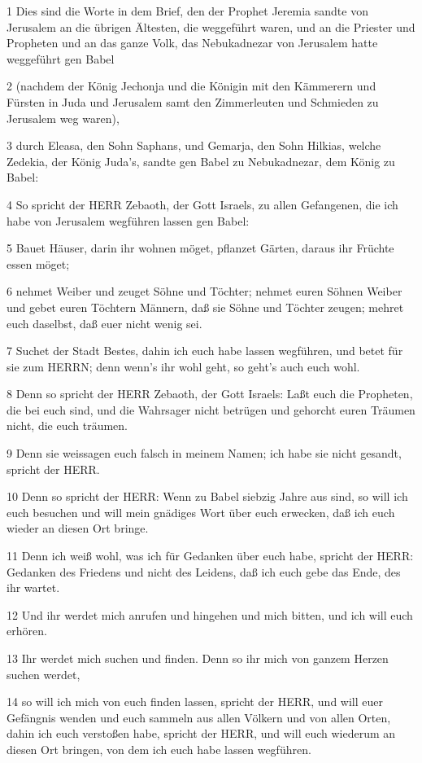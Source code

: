 \par 1 Dies sind die Worte in dem Brief, den der Prophet Jeremia sandte von Jerusalem an die übrigen Ältesten, die weggeführt waren, und an die Priester und Propheten und an das ganze Volk, das Nebukadnezar von Jerusalem hatte weggeführt gen Babel
\par 2 (nachdem der König Jechonja und die Königin mit den Kämmerern und Fürsten in Juda und Jerusalem samt den Zimmerleuten und Schmieden zu Jerusalem weg waren),
\par 3 durch Eleasa, den Sohn Saphans, und Gemarja, den Sohn Hilkias, welche Zedekia, der König Juda's, sandte gen Babel zu Nebukadnezar, dem König zu Babel:
\par 4 So spricht der HERR Zebaoth, der Gott Israels, zu allen Gefangenen, die ich habe von Jerusalem wegführen lassen gen Babel:
\par 5 Bauet Häuser, darin ihr wohnen möget, pflanzet Gärten, daraus ihr Früchte essen möget;
\par 6 nehmet Weiber und zeuget Söhne und Töchter; nehmet euren Söhnen Weiber und gebet euren Töchtern Männern, daß sie Söhne und Töchter zeugen; mehret euch daselbst, daß euer nicht wenig sei.
\par 7 Suchet der Stadt Bestes, dahin ich euch habe lassen wegführen, und betet für sie zum HERRN; denn wenn's ihr wohl geht, so geht's auch euch wohl.
\par 8 Denn so spricht der HERR Zebaoth, der Gott Israels: Laßt euch die Propheten, die bei euch sind, und die Wahrsager nicht betrügen und gehorcht euren Träumen nicht, die euch träumen.
\par 9 Denn sie weissagen euch falsch in meinem Namen; ich habe sie nicht gesandt, spricht der HERR.
\par 10 Denn so spricht der HERR: Wenn zu Babel siebzig Jahre aus sind, so will ich euch besuchen und will mein gnädiges Wort über euch erwecken, daß ich euch wieder an diesen Ort bringe.
\par 11 Denn ich weiß wohl, was ich für Gedanken über euch habe, spricht der HERR: Gedanken des Friedens und nicht des Leidens, daß ich euch gebe das Ende, des ihr wartet.
\par 12 Und ihr werdet mich anrufen und hingehen und mich bitten, und ich will euch erhören.
\par 13 Ihr werdet mich suchen und finden. Denn so ihr mich von ganzem Herzen suchen werdet,
\par 14 so will ich mich von euch finden lassen, spricht der HERR, und will euer Gefängnis wenden und euch sammeln aus allen Völkern und von allen Orten, dahin ich euch verstoßen habe, spricht der HERR, und will euch wiederum an diesen Ort bringen, von dem ich euch habe lassen wegführen.
